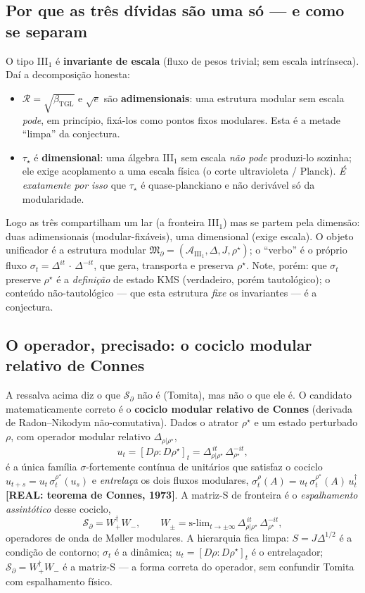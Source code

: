 \documentclass[12pt,a4paper]{article}
\newcommand{\betatgl}{\beta_{\text{TGL}}}
\newcommand{\rhostar}{\rho^{\star}}
\begin{document}
\subsection{Por que as três dívidas são uma só --- e como se separam}
O tipo III$_1$ é \textbf{invariante de escala} (fluxo de pesos trivial; sem escala intrínseca).  Daí a decomposição honesta:
\begin{itemize}
\item $\mathcal R=\sqrt{\betatgl}$ e $\sqrt e$ são \textbf{adimensionais}: uma estrutura modular sem escala \emph{pode}, em princípio, fixá-los como pontos fixos modulares.  Esta é a metade ``limpa'' da conjectura.
\item $\tau_\star$ é \textbf{dimensional}: uma álgebra III$_1$ sem escala \emph{não pode} produzi-lo sozinha; ele exige acoplamento a uma escala física (o corte ultravioleta / Planck).  \emph{É exatamente por isso} que $\tau_\star$ é quase-planckiano e não derivável só da modularidade.
\end{itemize}
Logo as três compartilham um lar (a fronteira III$_1$) mas se partem pela dimensão: duas adimensionais (modular-fixáveis), uma dimensional (exige escala).  O objeto unificador é a estrutura modular $\mathfrak{M}_\partial=(\mathcal A_{\mathrm{III}_1},\Delta,J,\rhostar)$; o ``verbo'' é o próprio fluxo $\sigma_t=\Delta^{it}\,\cdot\,\Delta^{-it}$, que gera, transporta e preserva $\rhostar$.  Note, porém: que $\sigma_t$ preserve $\rhostar$ é a \emph{definição} de estado KMS (verdadeiro, porém tautológico); o conteúdo não-tautológico --- que esta estrutura \emph{fixe} os invariantes --- é a conjectura.

\subsection{O operador, precisado: o cociclo modular relativo de Connes}
A ressalva acima diz o que $\mathcal S_\partial$ não é (Tomita), mas não o que ele é.  O candidato matematicamente correto é o \textbf{cociclo modular relativo de Connes} (derivada de Radon--Nikodym não-comutativa).  Dados o atrator $\rhostar$ e um estado perturbado $\rho$, com operador modular relativo $\Delta_{\rho|\rhostar}$,
\begin{equation}
u_t=[D\rho:D\rhostar]_t=\Delta_{\rho|\rhostar}^{\,it}\,\Delta_{\rhostar}^{-it},
\end{equation}
é a única família $\sigma$-fortemente contínua de unitários que satisfaz o cociclo $u_{t+s}=u_t\,\sigma^{\rhostar}_t(u_s)$ e \emph{entrelaça} os dois fluxos modulares, $\sigma^{\rho}_t(A)=u_t\,\sigma^{\rhostar}_t(A)\,u_t^\dagger$ \textbf{[REAL: teorema de Connes, 1973]}.  A matriz-S de fronteira é o \emph{espalhamento assintótico} desse cociclo,
\begin{equation}
\mathcal S_\partial=W_+^\dagger W_-,\qquad W_\pm=\text{s-lim}_{t\to\pm\infty}\,\Delta_{\rho|\rhostar}^{\,it}\,\Delta_{\rhostar}^{-it},
\end{equation}
operadores de onda de Møller modulares.  A hierarquia fica limpa: $S=J\Delta^{1/2}$ é a condição de contorno; $\sigma_t$ é a dinâmica; $u_t=[D\rho:D\rhostar]_t$ é o entrelaçador; $\mathcal S_\partial=W_+^\dagger W_-$ é a matriz-S --- a forma correta do operador, sem confundir Tomita com espalhamento físico.
\end{document}
